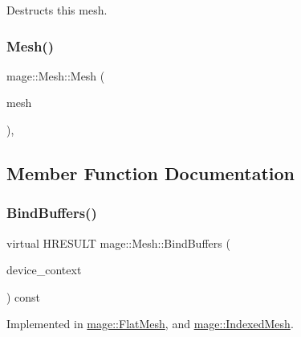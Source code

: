 Destructs this mesh. \hypertarget{classmage_1_1_mesh_a1627e85c72d10bdedbfbf746b108cc73}{}\label{classmage_1_1_mesh_a1627e85c72d10bdedbfbf746b108cc73} 
\subsubsection{\texorpdfstring{Mesh()}{Mesh()}\hspace{0.1cm}{\footnotesize\ttfamily [2/2]}}
{\footnotesize\ttfamily mage\+::\+Mesh\+::\+Mesh (\begin{DoxyParamCaption}\item[{const \hyperlink{classmage_1_1_mesh}{Mesh} \&}]{mesh }\end{DoxyParamCaption})\hspace{0.3cm}{\ttfamily [private]}, {\ttfamily [delete]}}



\subsection{Member Function Documentation}
\hypertarget{classmage_1_1_mesh_adb7cecd184c021c6184b6444adeb5190}{}\label{classmage_1_1_mesh_adb7cecd184c021c6184b6444adeb5190} 
\subsubsection{\texorpdfstring{Bind\+Buffers()}{BindBuffers()}}
{\footnotesize\ttfamily virtual H\+R\+E\+S\+U\+LT mage\+::\+Mesh\+::\+Bind\+Buffers (\begin{DoxyParamCaption}\item[{I\+D3\+D11\+Device\+Context2 $\ast$}]{device\+\_\+context }\end{DoxyParamCaption}) const\hspace{0.3cm}{\ttfamily [pure virtual]}}



Implemented in \hyperlink{classmage_1_1_flat_mesh_ab1906ae929a514a7b9b348d6a97fc2d4}{mage\+::\+Flat\+Mesh}, and \hyperlink{classmage_1_1_indexed_mesh_aeef933509fe7f74a79efb8a1692fda1f}{mage\+::\+Indexed\+Mesh}.

\hypertarget{classmage_1_1_mesh_a8ebd5d1a5159ebeda44e3fb6b98a115c}{}\label{classmage_1_1_mesh_a8ebd5d1a5159ebeda44e3fb6b98a115c} 
